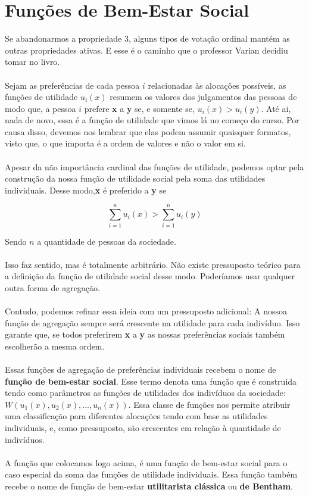 \documentclass[a4paper,11pt,oneside]{book}
\theoremstyle{definition}
\theoremstyle{break}
\begin{document}
\section{Funções de Bem-Estar Social}

Se abandonarmos a propriedade 3, alguns tipos de votação ordinal mantém as outras propriedades ativas. E esse é o caminho que o professor Varian decidiu tomar no livro.
\\~\\
Sejam as preferências de cada pessoa $i$ relacionadas às alocações possíveis, as funções de utilidade $u_i(x)$ resumem os valores dos julgamentos das pessoas de modo que, a pessoa $i$ prefere \textbf{x} a \textbf{y} se, e somente se, $u_i(x) > u_i(y)$. Até ai, nada de novo, essa é a função de utilidade que vimos lá no começo do curso. Por causa disso, devemos nos lembrar que elas podem assumir quaisquer formatos, visto que, o que importa é a ordem de valores e não o valor em si.
\\~\\
Apesar da não importância cardinal das funções de utilidade, podemos optar pela construção da nossa função de utilidade social pela soma das utilidades individuais. Desse modo,\textbf{x} é preferido a \textbf{y} se

$$  \displaystyle \sum^n_{i = 1} u_i(x) > \sum^n_{i = 1} u_i(y)$$

Sendo $n$ a quantidade de pessoas da sociedade.
\\~\\
Isso faz sentido, mas é totalmente arbitrário. Não existe pressuposto teórico para a definição da função de utilidade social desse modo. Poderíamos usar qualquer outra forma de agregação.
\\~\\
Contudo, podemos refinar essa ideia com um pressuposto adicional: A nossoa função de agregação sempre será crescente na utilidade para cada indivíduo. Isso garante que, se todos preferirem \textbf{x} a \textbf{y} as nossas preferências sociais também escolherão a mesma ordem.
\\~\\
Essas funções de agregação de preferências individuais recebem o nome de \textbf{função de bem-estar social}. Esse termo denota uma função que é construida tendo como parâmetros as funções de utilidades dos indivíduos da sociedade: $W(u_1(x),u_2(x),...,u_n(x))$. Essa classe de funções nos permite atribuir uma classificação para diferentes alocações tendo com base as utilidades individuais, e, como pressuposto, são crescentes em relação à quantidade de indivíduos.
\\~\\
A função que colocamos logo acima, é uma função de bem-estar social para o caso especial da soma das funções de utilidade individuais. Essa função também recebe o nome de  função de bem-estar \textbf{utilitarista clássica}
 ou \textbf{de Bentham}.
\end{document}
